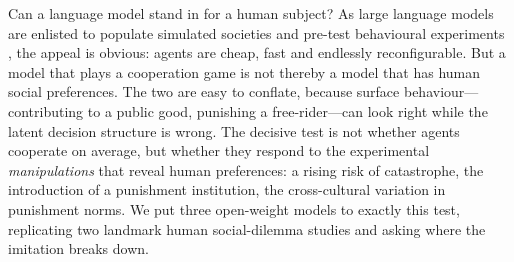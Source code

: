 \documentclass[openacc]{rsproca_new}%
\begin{document}

\begin{fmtext}

Can a language model stand in for a human subject? As large language models are enlisted to populate simulated societies and pre-test behavioural experiments \cite{park2023generative,argyle2023out,horton2023llm}, the appeal is obvious: agents are cheap, fast and endlessly reconfigurable. But a model that plays a cooperation game is not thereby a model that has human social preferences. The two are easy to conflate, because surface behaviour---contributing to a public good, punishing a free-rider---can look right while the latent decision structure is wrong. The decisive test is not whether agents cooperate on average, but whether they respond to the experimental \emph{manipulations} that reveal human preferences: a rising risk of catastrophe, the introduction of a punishment institution, the cross-cultural variation in punishment norms. We put three open-weight models to exactly this test, replicating two landmark human social-dilemma studies and asking where the imitation breaks down.

\end{fmtext}


\maketitle
\end{document}
